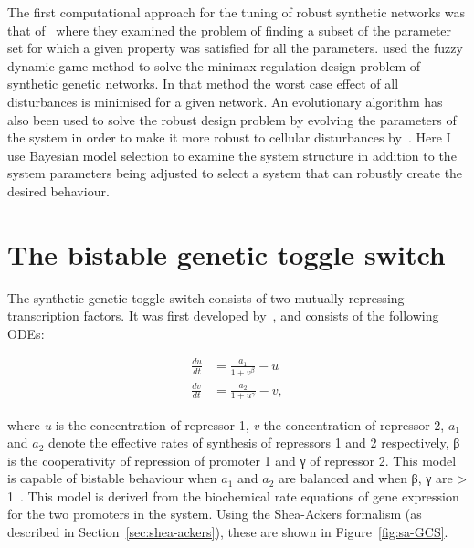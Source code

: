 The first computational approach for the tuning of robust synthetic networks was that of~\textcite{Batt:2007jl} where they examined the problem of finding a subset of the parameter set for which a given property was satisfied for all the parameters. \textcite{Chen:2009ea} used the fuzzy dynamic game method to solve the minimax regulation design problem of synthetic genetic networks. In that method the worst case effect of all disturbances is minimised for a given network. An evolutionary algorithm has also been used to solve the robust design problem by evolving the parameters of the system in order to make it more robust to cellular disturbances by~\textcite{Wu:2011bq}. Here I use Bayesian model selection to examine the system structure in addition to the system parameters being adjusted to select a system that can robustly create the desired behaviour.	

\section{The bistable genetic toggle switch}
The synthetic genetic toggle switch consists of two mutually repressing transcription factors. It was first developed by~\textcite{Gardner:2000vha}, and consists of the following ODEs:

\begin{align}\label{eq:gards1}
\frac{du}{dt} &= \frac{a_1}{1 +  v^{\beta}} - u \\ \label{eq:gards2}
\frac{dv}{dt} &= \frac{a_2}{1 +  u^{\gamma }} - v,
\end{align}

\noindent where \textit{u} is the concentration of repressor 1, \textit{v} the concentration of repressor 2, $a_1$ and $a_2$ denote the effective rates of synthesis of repressors 1 and 2 respectively, β is the cooperativity of repression of promoter 1 and γ of repressor 2. This model is capable of bistable behaviour when $a_1$ and $a_2$ are balanced and when β, γ are > 1~\autocite{Gardner:2000vha}. This model is derived from the biochemical rate equations of gene expression for the two promoters in the system. Using the Shea-Ackers formalism (as described in Section~\ref{sec:shea-ackers}), these are shown in Figure~\ref{fig:sa-GCS}.

